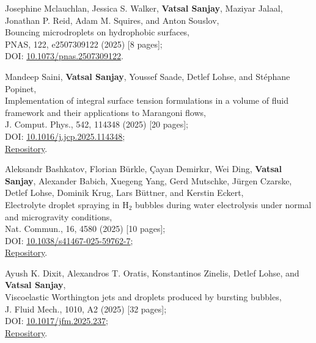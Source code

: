 	\item Josephine Mclauchlan, Jessica S. Walker, \textbf{Vatsal Sanjay}, Maziyar Jalaal, Jonathan P. Reid, Adam M. Squires, and Anton Souslov,\\
	Bouncing microdroplets on hydrophobic surfaces,\\
	PNAS, 122, e2507309122 (2025) [8 pages];\\
	\faFile\hspace{0.2em}DOI: \href{https://doi.org/10.1073/pnas.2507309122}{10.1073/pnas.2507309122}.

	\item Mandeep Saini, \textbf{Vatsal Sanjay}, Youssef Saade, Detlef Lohse, and Stéphane Popinet,\\
	Implementation of integral surface tension formulations in a volume of fluid framework and their applications to Marangoni flows,\\
	J. Comput. Phys., 542, 114348 (2025) [20 pages];\\
	\faFile\hspace{0.2em}DOI: \href{https://doi.org/10.1016/j.jcp.2025.114348}{10.1016/j.jcp.2025.114348};\\
	\faGithub\hspace{0.2em}\href{https://github.com/comphy-lab/marangoniSheet}{Repository}.

	\item Aleksandr Bashkatov, Florian Bürkle, Çayan Demirkır, Wei Ding, \textbf{Vatsal Sanjay}, Alexander Babich, Xuegeng Yang, Gerd Mutschke, Jürgen Czarske, Detlef Lohse, Dominik Krug, Lars Büttner, and Kerstin Eckert,\\
	Electrolyte droplet spraying in H$_2$ bubbles during water electrolysis under normal and microgravity conditions,\\
	Nat. Commun., 16, 4580 (2025) [10 pages];\\
	\faFile\hspace{0.2em}DOI: \href{https://doi.org/10.1038/s41467-025-59762-7}{10.1038/s41467-025-59762-7};\\
	\faGithub\hspace{0.2em}\href{https://github.com/VatsalSy/Asymmetries-in-coalescence}{Repository}.

	\item Ayush K. Dixit, Alexandros T. Oratis, Konstantinos Zinelis, Detlef Lohse, and \textbf{Vatsal Sanjay},\\
	Viscoelastic Worthington jets and droplets produced by bursting bubbles,\\
	J. Fluid Mech., 1010, A2 (2025) [32 pages];\\
	\faFile\hspace{0.2em}DOI: \href{https://doi.org/10.1017/jfm.2025.237}{10.1017/jfm.2025.237};\\
	\faGithub\hspace{0.2em}\href{https://github.com/comphy-lab/Viscoelastic-Worthington-jets-and-droplets-produced-by-bursting-bubbles}{Repository}.

